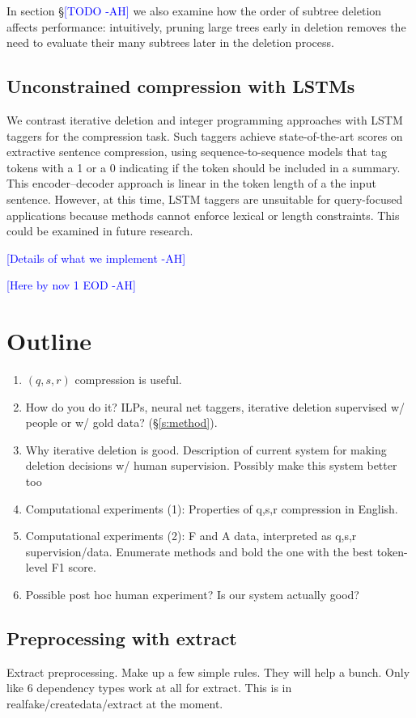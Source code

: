 \documentclass[11pt,a4paper]{article}
\newcommand{\ahcomment}[1]{\textcolor{blue}{[#1 -AH]}}
\begin{document}
In section \S\ahcomment{TODO} we also examine how the order of subtree deletion affects performance: intuitively, pruning large trees early in deletion removes the need to evaluate their many subtrees later in the deletion process.

\subsection{Unconstrained compression with LSTMs}

We contrast iterative deletion and integer programming approaches with LSTM taggers for the compression task. Such taggers achieve state-of-the-art scores on extractive sentence compression, using sequence-to-sequence models that tag tokens with a 1 or a 0 indicating if the token should be included in a summary. This encoder--decoder approach is linear in the token length of a the input sentence. However, at this time, LSTM taggers are unsuitable for query-focused applications because methods cannot enforce lexical or length constraints. This could be examined in future research.

\ahcomment{Details of what we implement}


\ahcomment{Here by nov 1 EOD}

\section{Outline}
\begin{enumerate}
\item{$(q,s,r)$ compression is useful.}
\item{How do you do it? ILPs, neural net taggers, iterative deletion supervised w/ people or w/ gold data? (\S\ref{s:method}).}
\item{Why iterative deletion is good. Description of current system for making deletion decisions w/ human supervision. Possibly make this system better too}
\item{Computational experiments (1): Properties of q,s,r compression in English. }
\item{Computational experiments (2): F and A data, interpreted as q,s,r supervision/data. Enumerate methods and bold the one with the best token-level F1 score.}
\item{Possible post hoc human experiment? Is our system actually good?}
\end{enumerate}



\subsection{Preprocessing with extract}
Extract preprocessing. Make up a few simple rules. They will help a bunch. Only like 6 dependency types work at all for extract. This is in realfake/createdata/extract at the moment.
\end{document}
